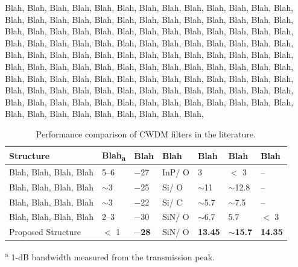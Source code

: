 \documentclass[lettersize,journal]{IEEEtran}
\def\SP#1{\textsuperscript{#1}}
\def\SB#1{\textsubscript{#1}}
\def\ur#1{{\color{ured}#1}}
\def\rur#1{{\color{rured}#1}}
\begin{document}
    Blah, Blah, Blah, Blah, Blah, Blah, Blah, Blah, Blah, Blah, Blah, Blah, Blah, Blah, Blah, Blah, Blah, Blah, 
    Blah, Blah, Blah, Blah, Blah, Blah, Blah, Blah, Blah, Blah, Blah, Blah, Blah, Blah, Blah, Blah, Blah, Blah, 
    Blah, Blah, Blah, Blah, Blah, Blah, Blah, Blah, Blah, Blah, Blah, Blah, Blah, Blah, Blah, Blah, Blah, Blah, 
    Blah, Blah, Blah, Blah, Blah, Blah, Blah, Blah, Blah, Blah, Blah, Blah, Blah, Blah, Blah, Blah, Blah, Blah, 
    Blah, Blah, Blah, Blah, Blah, Blah, Blah, Blah, Blah, Blah, Blah, Blah, Blah, Blah, Blah, Blah, Blah, Blah, 
    Blah, Blah, Blah, Blah, Blah, Blah, Blah, Blah, Blah, Blah, Blah, Blah, Blah, Blah, Blah, Blah, Blah, Blah, 
    Blah, Blah, Blah, Blah, Blah, Blah, Blah, Blah, Blah, Blah, Blah, Blah, Blah, Blah, Blah, Blah, Blah, Blah, 
    \begin{table}[!t]
		\caption{\label{tab:three}
		Performance comparison of CWDM filters in the literature.}
		\centering
		\begin{tabular}{|M{0.45in}|M{0.27in}|M{0.25in}|M{0.2in}|M{0.3in}|M{0.4in}|M{0.4in}|}	\hline %
			\textbf{Structure} & 
            \textbf{Blah\SB{a}} & 
            \textbf{Blah} & 
            \textbf{Blah} & 
            \textbf{Blah} & 
            \rur{\textbf{Blah}} & 
            \rur{\textbf{Blah}} \\ \hline
            
            Blah, Blah, Blah, Blah & 
                    5--6 & $-$27 & InP/ O & 3 & \rur{$<$ 3} & \rur{--} \\ \hline
            Blah, Blah, Blah, Blah & 
                    $\sim$3 & $-$25 & Si/ O & $\sim$11 & \rur{$\sim$12.8} & \rur{--} \\ \hline
            Blah, Blah, Blah, Blah & 
                    $\sim$3 & $-$2\rur{2} & Si/ C & $\sim$5.7 & \rur{$\sim$7.5} & \rur{--} \\ \hline
            Blah, Blah, Blah, Blah  & 
                    2--3 & $-$30 & SiN/ O & $\sim$6.7 & \rur{5.7} & \rur{$<$ 3} \\ \hline
            \ur{Proposed Structure} & 
                    $<$ \rur{1} & \rur{\textbf{$-$28}} & SiN/ O & \rur{\textbf{13.45}} & \rur{\textbf{$\sim$15.7}} & \rur{\textbf{14.35}} \\ \hline
		\end{tabular}
        \begin{flushleft}
			\SP{a} 1-dB bandwidth measured from \ur{the} transmission peak.\\	
		\end{flushleft}
	\end{table}
\end{document}
